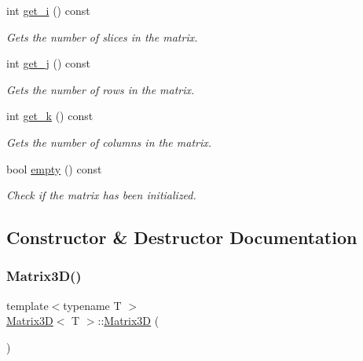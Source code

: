 \begin{DoxyCompactItemize}
int \mbox{\hyperlink{classMatrix3D_af02576e685de872ba1b75014d9a609c9}{get\+\_\+i}} () const
\begin{DoxyCompactList}\small\item\em Gets the number of slices in the matrix. \end{DoxyCompactList}\item 
int \mbox{\hyperlink{classMatrix3D_a083e3f136a0108aad991e194b078db7f}{get\+\_\+j}} () const
\begin{DoxyCompactList}\small\item\em Gets the number of rows in the matrix. \end{DoxyCompactList}\item 
int \mbox{\hyperlink{classMatrix3D_a35fad9c3c81914e0ef5ed40ceda5d324}{get\+\_\+k}} () const
\begin{DoxyCompactList}\small\item\em Gets the number of columns in the matrix. \end{DoxyCompactList}\item 
bool \mbox{\hyperlink{classMatrix3D_a6f1e6328bac16786a4bfad6f107db641}{empty}} () const
\begin{DoxyCompactList}\small\item\em Check if the matrix has been initialized. \end{DoxyCompactList}\end{DoxyCompactItemize}


\subsection{Constructor \& Destructor Documentation}
\mbox{\label{classMatrix3D_a1589c062f12fbbb1f3681f90c20c4b78}} 
\subsubsection{\texorpdfstring{Matrix3\+D()}{Matrix3D()}\hspace{0.1cm}{\footnotesize\ttfamily [1/3]}}
{\footnotesize\ttfamily template$<$typename T $>$ \\
\mbox{\hyperlink{classMatrix3D}{Matrix3D}}$<$ T $>$\+::\mbox{\hyperlink{classMatrix3D}{Matrix3D}} (\begin{DoxyParamCaption}{ }\end{DoxyParamCaption})}



